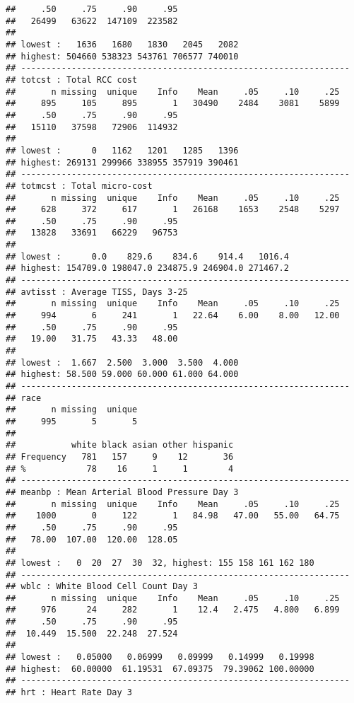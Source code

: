 \documentclass[headinclude=true, headsepline=true, DIV14]{scrartcl}\usepackage[]{graphicx}\usepackage[]{color}
\makeatletter
\newenvironment{kframe}{%
 \def\at@end@of@kframe{}%
 \ifinner\ifhmode%
  \def\at@end@of@kframe{\end{minipage}}%
  \begin{minipage}{\columnwidth}%
 \fi\fi%
 \def\FrameCommand##1{\hskip\@totalleftmargin \hskip-\fboxsep
 \colorbox{shadecolor}{##1}\hskip-\fboxsep
     \hskip-\linewidth \hskip-\@totalleftmargin \hskip\columnwidth}%
 \MakeFramed {\advance\hsize-\width
   \@totalleftmargin\z@ \linewidth\hsize
   \@setminipage}}%
 {\par\unskip\endMakeFramed%
 \at@end@of@kframe}
\newenvironment{knitrout}{}{} %
\makeatother
\begin{document}
\begin{knitrout}
\begin{kframe}
\begin{verbatim}
##     .50     .75     .90     .95 
##   26499   63622  147109  223582 
## 
## lowest :   1636   1680   1830   2045   2082
## highest: 504660 538323 543761 706577 740010 
## -----------------------------------------------------------------
## totcst : Total RCC cost 
##       n missing  unique    Info    Mean     .05     .10     .25 
##     895     105     895       1   30490    2484    3081    5899 
##     .50     .75     .90     .95 
##   15110   37598   72906  114932 
## 
## lowest :      0   1162   1201   1285   1396
## highest: 269131 299966 338955 357919 390461 
## -----------------------------------------------------------------
## totmcst : Total micro-cost 
##       n missing  unique    Info    Mean     .05     .10     .25 
##     628     372     617       1   26168    1653    2548    5297 
##     .50     .75     .90     .95 
##   13828   33691   66229   96753 
## 
## lowest :      0.0    829.6    834.6    914.4   1016.4
## highest: 154709.0 198047.0 234875.9 246904.0 271467.2 
## -----------------------------------------------------------------
## avtisst : Average TISS, Days 3-25 
##       n missing  unique    Info    Mean     .05     .10     .25 
##     994       6     241       1   22.64    6.00    8.00   12.00 
##     .50     .75     .90     .95 
##   19.00   31.75   43.33   48.00 
## 
## lowest :  1.667  2.500  3.000  3.500  4.000
## highest: 58.500 59.000 60.000 61.000 64.000 
## -----------------------------------------------------------------
## race 
##       n missing  unique 
##     995       5       5 
## 
##           white black asian other hispanic
## Frequency   781   157     9    12       36
## %            78    16     1     1        4
## -----------------------------------------------------------------
## meanbp : Mean Arterial Blood Pressure Day 3 
##       n missing  unique    Info    Mean     .05     .10     .25 
##    1000       0     122       1   84.98   47.00   55.00   64.75 
##     .50     .75     .90     .95 
##   78.00  107.00  120.00  128.05 
## 
## lowest :   0  20  27  30  32, highest: 155 158 161 162 180 
## -----------------------------------------------------------------
## wblc : White Blood Cell Count Day 3 
##       n missing  unique    Info    Mean     .05     .10     .25 
##     976      24     282       1    12.4   2.475   4.800   6.899 
##     .50     .75     .90     .95 
##  10.449  15.500  22.248  27.524 
## 
## lowest :   0.05000   0.06999   0.09999   0.14999   0.19998
## highest:  60.00000  61.19531  67.09375  79.39062 100.00000 
## -----------------------------------------------------------------
## hrt : Heart Rate Day 3 

\end{verbatim}
\end{kframe}
\end{knitrout}
\end{document}
